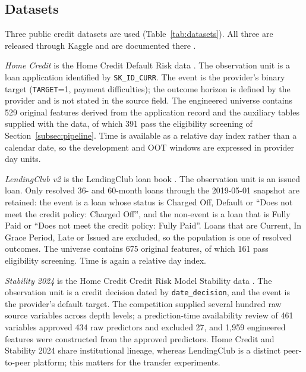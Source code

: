 \documentclass[preprint,12pt]{elsarticle}
\begin{document}
\subsection{Datasets}
\label{subsec:datasets}

Three public credit datasets are used (Table~\ref{tab:datasets}). All three are released through Kaggle and are documented there \cite{homecredit2018,lendingclub_kaggle,homecredit2024}.

\emph{Home Credit} is the Home Credit Default Risk data \cite{homecredit2018}. The observation unit is a loan application identified by \texttt{SK\_ID\_CURR}. The event is the provider's binary target (\texttt{TARGET}=1, payment difficulties); the outcome horizon is defined by the provider and is not stated in the source field. The engineered universe contains 529 original features derived from the application record and the auxiliary tables supplied with the data, of which 391 pass the eligibility screening of Section~\ref{subsec:pipeline}. Time is available as a relative day index rather than a calendar date, so the development and OOT windows are expressed in provider day units.

\emph{LendingClub v2} is the LendingClub loan book \cite{lendingclub_kaggle}. The observation unit is an issued loan. Only resolved 36- and 60-month loans through the 2019-05-01 snapshot are retained: the event is a loan whose status is Charged Off, Default or ``Does not meet the credit policy: Charged Off'', and the non-event is a loan that is Fully Paid or ``Does not meet the credit policy: Fully Paid''. Loans that are Current, In Grace Period, Late or Issued are excluded, so the population is one of resolved outcomes. The universe contains 675 original features, of which 161 pass eligibility screening. Time is again a relative day index.

\emph{Stability 2024} is the Home Credit Credit Risk Model Stability data \cite{homecredit2024}. The observation unit is a credit decision dated by \texttt{date\_decision}, and the event is the provider's default target. The competition supplied several hundred raw source variables across depth levels; a prediction-time availability review of 461 variables approved 434 raw predictors and excluded 27, and 1,959 engineered features were constructed from the approved predictors. Home Credit and Stability 2024 share institutional lineage, whereas LendingClub is a distinct peer-to-peer platform; this matters for the transfer experiments.
\end{document}
